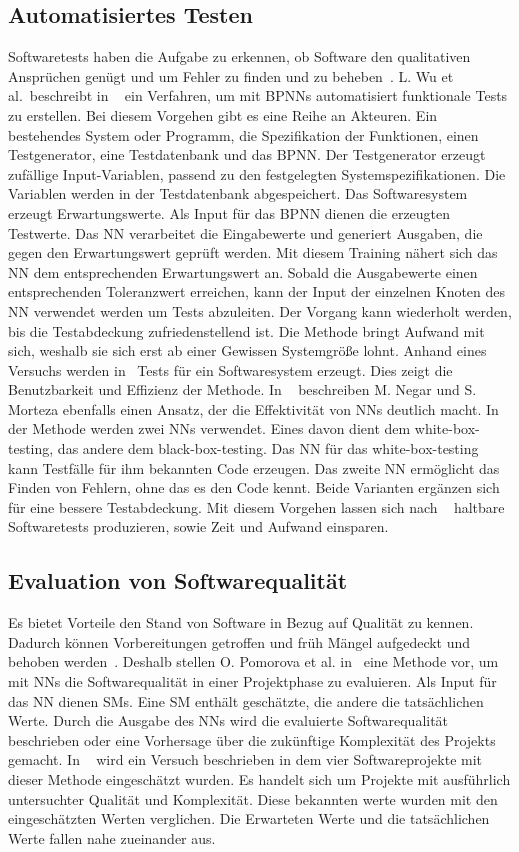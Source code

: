 \subsection{Automatisiertes Testen}
Softwaretests haben die Aufgabe zu erkennen, ob Software den qualitativen Ansprüchen genügt und um Fehler zu finden und zu beheben~\cite{Wu2008}.
L. Wu et al.~beschreibt in ~\cite{Wu2008} ein Verfahren, um mit BPNNs automatisiert funktionale Tests zu erstellen. 
Bei diesem Vorgehen gibt es eine Reihe an Akteuren. Ein bestehendes System oder Programm, die Spezifikation der Funktionen, einen Testgenerator, eine Testdatenbank und das BPNN. Der Testgenerator erzeugt zufällige Input-Variablen, passend zu den festgelegten Systemspezifikationen. Die Variablen werden in der Testdatenbank abgespeichert. Das Softwaresystem erzeugt Erwartungswerte. Als Input für das BPNN dienen die erzeugten Testwerte. Das NN verarbeitet die Eingabewerte und generiert Ausgaben, die gegen den Erwartungswert geprüft werden.
Mit diesem Training nähert sich das NN dem entsprechenden Erwartungswert an.
Sobald die Ausgabewerte einen entsprechenden Toleranzwert erreichen, kann der Input der einzelnen Knoten des NN verwendet werden um Tests abzuleiten. Der Vorgang kann wiederholt werden, bis die Testabdeckung zufriedenstellend ist. Die Methode bringt Aufwand mit sich, weshalb sie sich erst ab einer Gewissen Systemgröße lohnt. Anhand eines Versuchs werden in~\cite{Wu2008} Tests für ein Softwaresystem erzeugt. Dies zeigt die Benutzbarkeit und Effizienz der Methode.
\noindent In ~\cite{Majma2014} beschreiben M. Negar und S. Morteza ebenfalls einen Ansatz, der die Effektivität von NNs deutlich macht. In der Methode werden zwei NNs verwendet. Eines davon dient dem white-box-testing, das andere dem black-box-testing. Das NN für das white-box-testing kann Testfälle für ihm bekannten Code erzeugen. Das zweite NN ermöglicht das Finden von Fehlern, ohne das es den Code kennt. Beide Varianten ergänzen sich für eine bessere Testabdeckung. Mit diesem Vorgehen lassen sich nach ~\cite{Majma2014} haltbare Softwaretests produzieren, sowie Zeit und Aufwand einsparen.

\subsection{Evaluation von Softwarequalität}
Es bietet Vorteile den Stand von Software in Bezug auf Qualität zu kennen. Dadurch können Vorbereitungen getroffen und früh Mängel aufgedeckt und behoben werden~\cite{Pomorova2013}. Deshalb stellen O. Pomorova et al. in~\cite{Pomorova2013} eine Methode vor, um mit NNs die Softwarequalität in einer Projektphase zu evaluieren. Als Input für das NN dienen SMs. Eine SM enthält geschätzte, die andere die tatsächlichen Werte.
Durch die Ausgabe des NNs wird die evaluierte Softwarequalität beschrieben oder eine Vorhersage über die zukünftige Komplexität des Projekts gemacht. 
In ~\cite{Pomorova2013} wird ein Versuch beschrieben in dem vier Softwareprojekte mit dieser Methode eingeschätzt wurden. Es handelt sich um Projekte mit ausführlich untersuchter Qualität und Komplexität. Diese bekannten werte wurden mit den eingeschätzten Werten verglichen. Die Erwarteten Werte und die tatsächlichen Werte fallen nahe zueinander aus.

